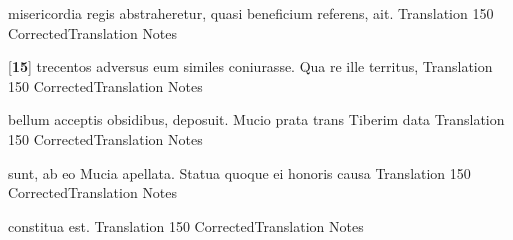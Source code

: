 \latline
  {misericordia regis abstraheretur, quasi beneficium referens, ait.}
  { Translation }
  {150}
  { CorrectedTranslation }
  { Notes }


\latline
  {[\textbf{15}] trecentos adversus eum similes coniurasse.  Qua re ille territus,}
  { Translation }
  {150}
  { CorrectedTranslation }
  { Notes }


\latline
  {bellum acceptis obsidibus, deposuit.  Mucio prata trans Tiberim data}
  { Translation }
  {150}
  { CorrectedTranslation }
  { Notes }


\latline
  {sunt, ab eo Mucia apellata.  Statua quoque ei honoris causa }
  { Translation }
  {150}
  { CorrectedTranslation }
  { Notes }


\latline
  {constitua est.}
  { Translation }
  {150}
  { CorrectedTranslation }
  { Notes }




